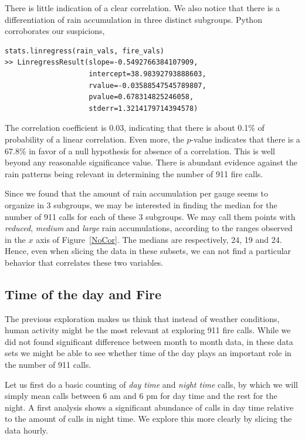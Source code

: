 \documentclass[12pt,a4paper]{article}
\begin{document}
There is little indication of a clear correlation. We also notice that there is a differentiation of rain accumulation in three distinct subgroups. Python corroborates our suspicions,

\begin{verbatim}
stats.linregress(rain_vals, fire_vals)
>> LinregressResult(slope=-0.5492766384107909,
                    intercept=38.98392793888603,
                    rvalue=-0.03588547545789807,
                    pvalue=0.678314825246058,
                    stderr=1.3214179714394578)
\end{verbatim}


The correlation coefficient is 0.03, indicating that there is about 0.1\% of probability of a linear correlation. Even more, the $p$-value indicates that there is a 67.8\% in favor of a null hypothesis for absence of a correlation. This is well beyond any reasonable significance value. There is abundant evidence against the rain patterns being relevant in determining the number of 911 fire calls.

Since we found that the amount of rain accumulation per gauge seems to organize in 3 subgroups, we may be interested in finding the median for the number of 911 calls for each of these 3 subgroups. We may call them points with \emph{reduced}, \emph{medium} and \emph{large} rain accumulations, according to the ranges observed in the $x$ axis of Figure~\ref{NoCor}. The medians are respectively, 24, 19 and 24. Hence, even when slicing the data in these subsets, we can not find a particular behavior that correlates these two variables.

\subsection{Time of the day and Fire}


The previous exploration makes us think that instead of weather conditions, human activity might be the most relevant at exploring 911 fire calls. While we did not found significant difference between month to month data, in these data sets we might be able to see whether time of the day plays an important role in the number of 911 calls.

Let us first do a basic counting of \emph{day time} and \emph{night time} calls, by which we will simply mean calls between 6 am and 6 pm for day time and the rest for the night. A first analysis shows a significant abundance of calls in day time relative to the amount of calls in night time. We explore this more clearly by slicing the data hourly.
\end{document}
